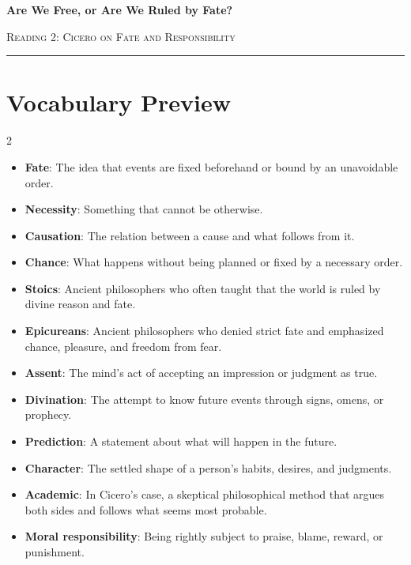 \documentclass[12pt]{article}
\begin{document}
\begin{center}
{\LARGE\bfseries Are We Free, or Are We Ruled by Fate?}\par\vspace{0.25em}
{\large\scshape Reading 2: Cicero on Fate and Responsibility}\par\vspace{0.45em}
\rule{0.82\textwidth}{0.4pt}\par\vspace{0.7em}
\end{center}

\section*{Vocabulary Preview}
\begin{multicols}{2}
\begin{itemize}[leftmargin=*, itemsep=0.18em]
\item \textbf{Fate}: The idea that events are fixed beforehand or bound by an unavoidable order.
\item \textbf{Necessity}: Something that cannot be otherwise.
\item \textbf{Causation}: The relation between a cause and what follows from it.
\item \textbf{Chance}: What happens without being planned or fixed by a necessary order.
\item \textbf{Stoics}: Ancient philosophers who often taught that the world is ruled by divine reason and fate.
\item \textbf{Epicureans}: Ancient philosophers who denied strict fate and emphasized chance, pleasure, and freedom from fear.
\item \textbf{Assent}: The mind's act of accepting an impression or judgment as true.
\item \textbf{Divination}: The attempt to know future events through signs, omens, or prophecy.
\item \textbf{Prediction}: A statement about what will happen in the future.
\item \textbf{Character}: The settled shape of a person's habits, desires, and judgments.
\item \textbf{Academic}: In Cicero's case, a skeptical philosophical method that argues both sides and follows what seems most probable.
\item \textbf{Moral responsibility}: Being rightly subject to praise, blame, reward, or punishment.
\end{itemize}
\end{multicols}
\end{document}
